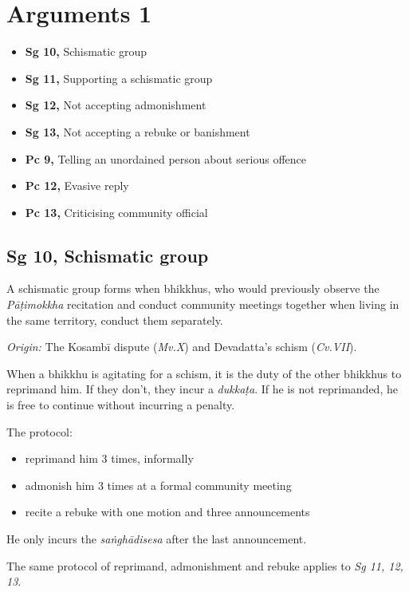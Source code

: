 \chapter{Arguments 1}

\begin{itemize}
\tightlist
\item
  \textbf{Sg 10,} Schismatic group
\item
  \textbf{Sg 11,} Supporting a schismatic group
\item
  \textbf{Sg 12,} Not accepting admonishment
\item
  \textbf{Sg 13,} Not accepting a rebuke or banishment
\item
  \textbf{Pc 9,} Telling an unordained person about serious offence
\item
  \textbf{Pc 12,} Evasive reply
\item
  \textbf{Pc 13,} Criticising community official
\end{itemize}

\section{Sg 10, Schismatic group}

A schismatic group forms when bhikkhus, who would previously observe the
\emph{Pāṭimokkha} recitation and conduct community meetings together
when living in the same territory, conduct them separately.

\emph{Origin:} The Kosambī dispute (\emph{Mv.X}) and Devadatta's schism
(\emph{Cv.VII}).

When a bhikkhu is agitating for a schism, it is the duty of the other
bhikkhus to reprimand him. If they don't, they incur a \emph{dukkaṭa}.
If he is not reprimanded, he is free to continue without incurring a
penalty.

The protocol:

\begin{itemize}
\tightlist
\item
  reprimand him 3 times, informally
\item
  admonish him 3 times at a formal community meeting
\item
  recite a rebuke with one motion and three announcements
\end{itemize}

He only incurs the \emph{saṅghādisesa} after the last announcement.

The same protocol of reprimand, admonishment and rebuke applies to
\emph{Sg 11, 12, 13}.

